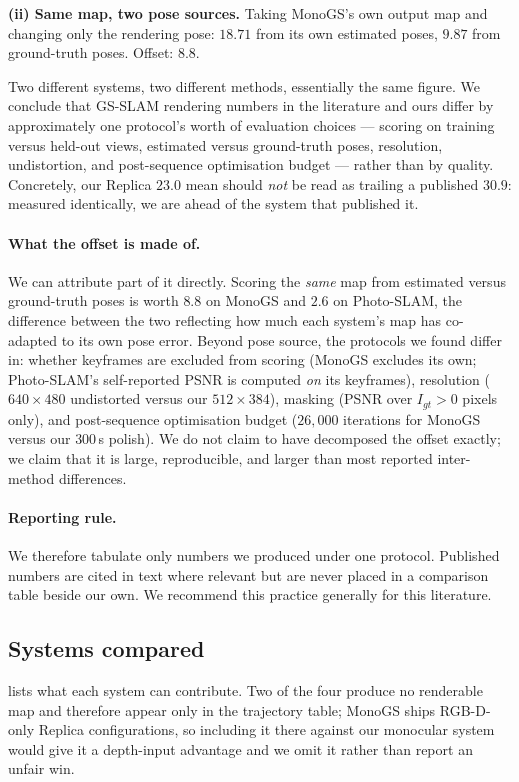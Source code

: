 \noindent\textbf{(ii) Same map, two pose sources.}
Taking MonoGS's own output map and changing only the rendering pose:
$18.71$\dB{} from its own estimated poses, $9.87$\dB{} from ground-truth poses.
Offset: $\mathbf{8.8}$\dB{}.

Two different systems, two different methods, essentially the same figure. We
conclude that GS-SLAM rendering numbers in the literature and ours differ by
approximately one protocol's worth of evaluation choices --- scoring on
training versus held-out views, estimated versus ground-truth poses,
resolution, undistortion, and post-sequence optimisation budget --- rather than
by quality. Concretely, our Replica $23.0$\dB{} mean should \emph{not} be read
as trailing a published $30.9$\dB{}: measured identically, we are ahead of the
system that published it.

\paragraph{What the offset is made of.}
We can attribute part of it directly. Scoring the \emph{same} map from
estimated versus ground-truth poses is worth $8.8$\dB{} on MonoGS and
$2.6$\dB{} on Photo-SLAM, the difference between the two reflecting how much
each system's map has co-adapted to its own pose error. Beyond pose source,
the protocols we found differ in: whether keyframes are excluded from scoring
(MonoGS excludes its own; Photo-SLAM's self-reported PSNR is computed
\emph{on} its keyframes), resolution ($640\!\times\!480$ undistorted versus our
$512\!\times\!384$), masking (PSNR over $I_{gt}>0$ pixels only), and
post-sequence optimisation budget ($26{,}000$ iterations for MonoGS versus our
$300$\,s polish). We do not claim to have decomposed the offset exactly; we
claim that it is large, reproducible, and larger than most reported
inter-method differences.

\paragraph{Reporting rule.} We therefore tabulate only numbers we produced
under one protocol. Published numbers are cited in text where relevant but are
never placed in a comparison table beside our own. We recommend this practice
generally for this literature.

\subsection{Systems compared}
 lists what each system can contribute. Two of the four
produce no renderable map and therefore appear only in the trajectory table;
MonoGS ships RGB-D-only Replica configurations, so including it there against
our monocular system would give it a depth-input advantage and we omit it
rather than report an unfair win.

